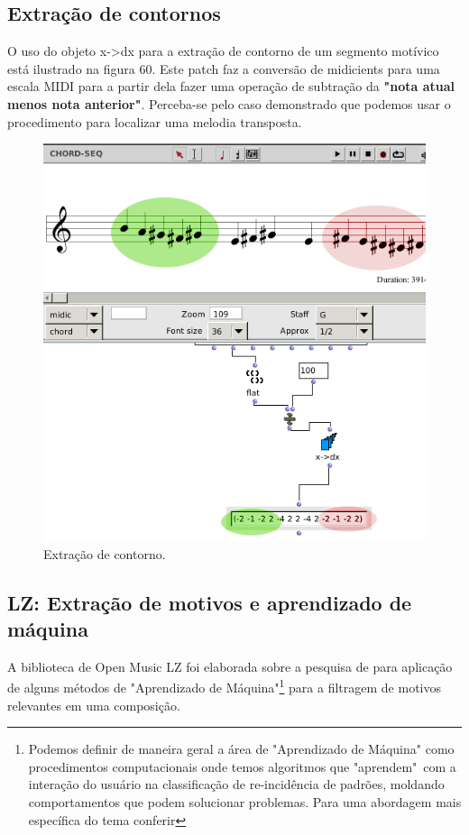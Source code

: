 \documentclass[
	12pt,				%
	openright,			%
	twoside,			%
	a4paper,			%
	english,			%
	french,				%
	spanish,			%
	brazil				%
	]{abntex2}
\begin{document}
\subsection{Extração de contornos}

O uso do objeto x->dx para a extração de contorno de um segmento motívico está ilustrado na figura 60. Este patch faz a conversão de midicients para uma escala MIDI para a partir dela fazer uma operação de subtração da \textbf{"nota atual menos nota anterior"}. Perceba-se pelo caso demonstrado que podemos usar o procedimento para localizar uma melodia transposta. 

\begin{figure}[!h]
	\caption{\label{fig_grafico}Extração de contorno. }
	\begin{center}
	    \includegraphics[scale=0.55]{OM_settheory/x_dx.png}
	\end{center}
\end{figure}


\subsection{LZ: Extração de motivos e aprendizado de máquina}	
\label{lz}

A biblioteca de Open Music LZ foi elaborada sobre a pesquisa de  para aplicação de alguns métodos de "Aprendizado de Máquina"\footnote{Podemos definir de maneira geral a área de "Aprendizado de Máquina" como procedimentos computacionais onde temos algoritmos que "aprendem"\ com a interação do usuário na classificação de re-incidência de padrões, moldando comportamentos que podem solucionar problemas. Para uma abordagem mais específica do tema conferir } para a filtragem de motivos relevantes em uma composição.
\end{document}
